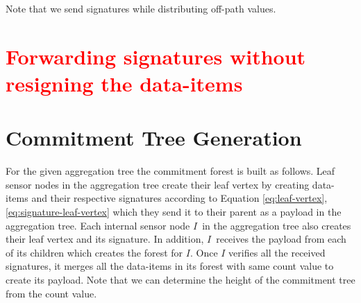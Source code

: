 		Note that we send signatures while distributing off-path values.
	\section{\textcolor{red}{Forwarding signatures without resigning the data-items}}

	\section{Commitment Tree Generation}
	For the given aggregation tree the commitment forest is built as follows.
	Leaf sensor nodes in the aggregation tree create their leaf vertex by creating data-items and their respective signatures according to Equation \ref{eq:leaf-vertex}, \ref{eq:signature-leaf-vertex} which they send it to their parent as a payload in the aggregation tree.
	Each internal sensor node $I$\ in the aggregation tree also creates their leaf vertex and its signature.
	In addition, $I$\ receives the payload from each of its children which creates the forest for $I$.
	Once $I$ verifies all the received signatures, it merges all the data-items in its forest with same count value to create its payload.
	Note that we can determine the height of the commitment tree from the count value.

